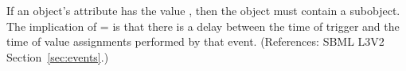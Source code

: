 If an \Event object's  attribute has the
value , then the \Event object must contain a \Delay subobject.
The implication of = is that
there is a delay between the time of trigger and the time of value
assignments performed by that event.  (References: SBML L3V2
Section~\ref{sec:events}.)
